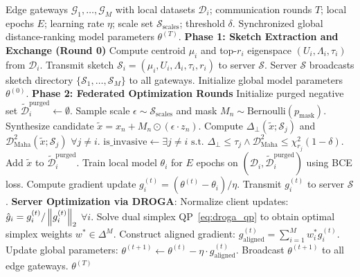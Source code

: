 \begin{algorithm}[t]
\caption{Fed-LUNAR Federated Training Protocol}
\label{alg:fed_lunar_training}
\begin{algorithmic}[1]
\REQUIRE Edge gateways $\mathcal{G}_1, \dots, \mathcal{G}_M$ with local datasets $\mathcal{D}_i$; communication rounds $T$; local epochs $E$; learning rate $\eta$; scale set $\mathcal{S}_{\text{scales}}$; threshold $\delta$.
\ENSURE Synchronized global distance-ranking model parameters $\theta^{(T)}$.
\STATE \textbf{Phase 1: Sketch Extraction and Exchange (Round 0)}
    \STATE Compute centroid $\mu_i$ and top-$r_i$ eigenspace $(U_i, \Lambda_i, \tau_i)$ from $\mathcal{D}_i$.
    \STATE Transmit sketch $\mathcal{S}_i = (\mu_i, U_i, \Lambda_i, \tau_i, r_i)$ to server $\mathcal{S}$.
\ENDFOR
\STATE Server $\mathcal{S}$ broadcasts sketch directory $\{\mathcal{S}_1, \dots, \mathcal{S}_M\}$ to all gateways.
\STATE Initialize global model parameters $\theta^{(0)}$.
\STATE \textbf{Phase 2: Federated Optimization Rounds}
        \STATE Initialize purged negative set $\tilde{\mathcal{D}}_i^{\text{purged}} \leftarrow \emptyset$.
            \REPEAT
                \STATE Sample scale $\epsilon \sim \mathcal{S}_{\text{scales}}$ and mask $M_n \sim \text{Bernoulli}(p_{\text{mask}})$.
                \STATE Synthesize candidate $\tilde{x} = x_n + M_n \odot (\epsilon \cdot z_n)$.
                \STATE Compute $\Delta_{\perp}(\tilde{x}; \mathcal{S}_j)$ and $\mathcal{D}_{\text{Maha}}^2(\tilde{x}; \mathcal{S}_j)$ $\forall j \neq i$.
                \STATE $\text{is\_invasive} \leftarrow \exists j \neq i \text{ s.t. } \Delta_{\perp} \le \tau_j \land \mathcal{D}_{\text{Maha}}^2 \le \chi^2_{r_j}(1-\delta)$.
            \STATE Add $\tilde{x}$ to $\tilde{\mathcal{D}}_i^{\text{purged}}$.
        \ENDFOR
        \STATE Train local model $\theta_i$ for $E$ epochs on $(\mathcal{D}_i, \tilde{\mathcal{D}}_i^{\text{purged}})$ using BCE loss.
        \STATE Compute gradient update $g_i^{(t)} = (\theta^{(t)} - \theta_i) / \eta$.
        \STATE Transmit $g_i^{(t)}$ to server $\mathcal{S}$.
    \ENDFOR
    \STATE \textbf{Server Optimization via DROGA}:
    \STATE Normalize client updates: $\hat{g}_i = g_i^{(t)} / \left\lVert g_i^{(t)}\right\rVert_2$ $\forall i$.
    \STATE Solve dual simplex QP~\eqref{eq:droga_qp} to obtain optimal simplex weights $w^* \in \Delta^M$.
    \STATE Construct aligned gradient: $g_{\text{aligned}}^{(t)} = \sum_{i=1}^M w_i^* g_i^{(t)}$.
    \STATE Update global parameters: $\theta^{(t+1)} \leftarrow \theta^{(t)} - \eta \cdot g_{\text{aligned}}^{(t)}$.
    \STATE Broadcast $\theta^{(t+1)}$ to all edge gateways.
\ENDFOR
\RETURN $\theta^{(T)}$
\end{algorithmic}
\end{algorithm}

